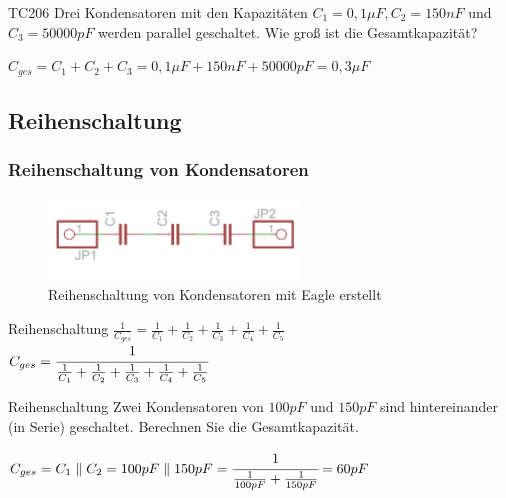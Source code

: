 \begin{frame}
  \begin{exampleblock}{TC206}
    Drei Kondensatoren mit den Kapazitäten $C_{1} = 0,1 \mu F, C_{2} = 150 nF$ und $C_{3} = 50000 pF$ werden parallel geschaltet. Wie groß ist die Gesamtkapazität?
  \end{exampleblock}
  \pause
  \begin{center}
    $C_{ges} = C_1 + C_2 + C_3 = 0,1 \mu F + 150 nF + 50000 pF = 0,3 \mu F$
  \end{center}
\end{frame}

\subsection*{Reihen\-schaltung}

\begin{frame}
  \frametitle{Reihenschaltung von Kondensatoren}
  \begin{center}
    \begin{figure}
      \includegraphics[width=0.6\textwidth,height=.5\textheight,keepaspectratio]{e05/c-reihe.png}
      \caption{Reihenschaltung von Kondensatoren {\tiny mit Eagle erstellt}}
    \end{figure}
  \end{center}
  \begin{block}{Reihenschaltung}
    $\frac{1}{C_{ges}} = \frac{1}{C_1} + \frac{1}{C_2} + \frac{1}{C_3} + \frac{1}{C_4} + \frac{1}{C_5}$\\
    $C_{ges} = \cfrac{1}{\frac{1}{C_1} + \frac{1}{C_2} + \frac{1}{C_3} + \frac{1}{C_4} + \frac{1}{C_5}}$
  \end{block}
\end{frame}

\begin{frame}
  \begin{exampleblock}{Reihenschaltung}
    Zwei Kondensatoren von $100 pF$ und $150 pF$ sind hintereinander (in Serie) geschaltet. Berechnen Sie die Gesamtkapazität.
  \end{exampleblock}
  \pause
  \begin{center}
    $C_{ges} = C_1 \parallel C_2 = 100 pF \parallel 150 pF = \cfrac{1}{\frac{1}{100 pF} + \frac{1}{150 pF}} = 60 pF$
  \end{center}
\end{frame}

